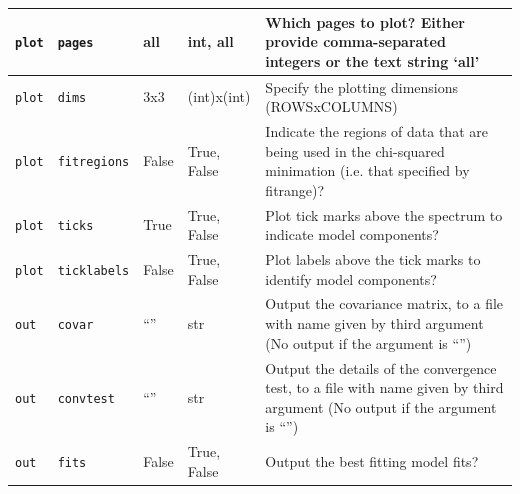 \begin{center}
\begin{longtable}{p{1.5cm}p{2.5cm}p{2.0cm}p{2.0cm}p{5.0cm}}
\multicolumn{1}{p{1.5cm}}{\texttt{plot}} &
\multicolumn{1}{p{2.5cm}}{\texttt{pages}} &
\multicolumn{1}{p{2.0cm}}{all} &
\multicolumn{1}{p{2.0cm}}{int, all} &
\multicolumn{1}{p{5.0cm}}{Which pages to plot? Either provide comma-separated integers or the text string `all'} \\ \midrule

\multicolumn{1}{p{1.5cm}}{\texttt{plot}} &
\multicolumn{1}{p{2.5cm}}{\texttt{dims}} &
\multicolumn{1}{p{2.0cm}}{3x3} &
\multicolumn{1}{p{2.0cm}}{(int)x(int)} &
\multicolumn{1}{p{5.0cm}}{Specify the plotting dimensions (ROWSxCOLUMNS)} \\ \midrule

\multicolumn{1}{p{1.5cm}}{\texttt{plot}} &
\multicolumn{1}{p{2.5cm}}{\texttt{fitregions}} &
\multicolumn{1}{p{2.0cm}}{False} &
\multicolumn{1}{p{2.0cm}}{True, False} &
\multicolumn{1}{p{5.0cm}}{Indicate the regions of data that are being used in the chi-squared minimation (i.e. that specified by fitrange)?} \\ \midrule

\multicolumn{1}{p{1.5cm}}{\texttt{plot}} &
\multicolumn{1}{p{2.5cm}}{\texttt{ticks}} &
\multicolumn{1}{p{2.0cm}}{True} &
\multicolumn{1}{p{2.0cm}}{True, False} &
\multicolumn{1}{p{5.0cm}}{Plot tick marks above the spectrum to indicate model components?} \\ \midrule

\multicolumn{1}{p{1.5cm}}{\texttt{plot}} &
\multicolumn{1}{p{2.5cm}}{\texttt{ticklabels}} &
\multicolumn{1}{p{2.0cm}}{False} &
\multicolumn{1}{p{2.0cm}}{True, False} &
\multicolumn{1}{p{5.0cm}}{Plot labels above the tick marks to identify model components?} \\ \midrule

\multicolumn{1}{p{1.5cm}}{\texttt{out}} &
\multicolumn{1}{p{2.5cm}}{\texttt{covar}} &
\multicolumn{1}{p{2.0cm}}{``''} &
\multicolumn{1}{p{2.0cm}}{str} &
\multicolumn{1}{p{5.0cm}}{Output the covariance matrix, to a file with name given by third argument (No output if the argument is ``'')} \\ \midrule

\multicolumn{1}{p{1.5cm}}{\texttt{out}} &
\multicolumn{1}{p{2.5cm}}{\texttt{convtest}} &
\multicolumn{1}{p{2.0cm}}{``''} &
\multicolumn{1}{p{2.0cm}}{str} &
\multicolumn{1}{p{5.0cm}}{Output the details of the convergence test, to a file with name given by third argument (No output if the argument is ``'')} \\ \midrule

\multicolumn{1}{p{1.5cm}}{\texttt{out}} &
\multicolumn{1}{p{2.5cm}}{\texttt{fits}} &
\multicolumn{1}{p{2.0cm}}{False} &
\multicolumn{1}{p{2.0cm}}{True, False} &
\multicolumn{1}{p{5.0cm}}{Output the best fitting model fits?} \\ \midrule


\end{longtable}
\end{center}
